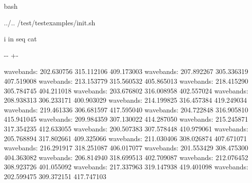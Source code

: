 \documentclass[letterpaper,10pt,english]{sphinxmanual}
\newlength\nbsphinxcodecellspacing
\begin{document}
{
\begin{sphinxVerbatim}[commandchars=\\\{\}]
\llap{\color{nbsphinxin}[17]:\,\hspace{\fboxrule}\hspace{\fboxsep}}\PYGZpc{}\PYGZpc{}bash


 ../..
 /test/test\PYGZus{}examples/init.sh


 i in seq   
cat 



\end{sphinxVerbatim}
}

{

\kern-\sphinxverbatimsmallskipamount\kern-\baselineskip
\kern+\FrameHeightAdjust\kern-\fboxrule
\vspace{\nbsphinxcodecellspacing}

\begin{sphinxVerbatim}[commandchars=\\\{\}]
wavebands: 202.630756 315.112106 409.173003
wavebands: 207.892267 305.336319 407.519008
wavebands: 213.153779 315.560532 405.865013
wavebands: 218.415290 305.784745 404.211018
wavebands: 203.676802 316.008958 402.557024
wavebands: 208.938313 306.233171 400.903029
wavebands: 214.199825 316.457384 419.249034
wavebands: 219.461336 306.681597 417.595040
wavebands: 204.722848 316.905810 415.941045
wavebands: 209.984359 307.130022 414.287050
wavebands: 215.245871 317.354235 412.633055
wavebands: 200.507383 307.578448 410.979061
wavebands: 205.768894 317.802661 409.325066
wavebands: 211.030406 308.026874 407.671071
wavebands: 216.291917 318.251087 406.017077
wavebands: 201.553429 308.475300 404.363082
wavebands: 206.814940 318.699513 402.709087
wavebands: 212.076452 308.923726 401.055092
wavebands: 217.337963 319.147938 419.401098
wavebands: 202.599475 309.372151 417.747103
\end{sphinxVerbatim}
}
\end{document}
